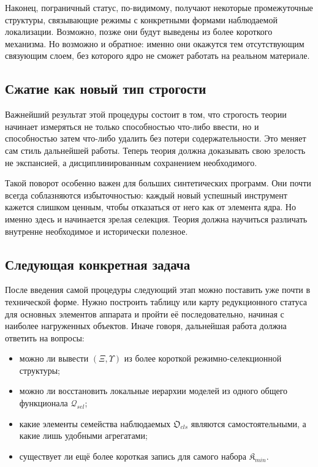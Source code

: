 \documentclass[12pt,a4paper]{article}
\begin{document}
Наконец, пограничный статус, по-видимому, получают некоторые промежуточные структуры, связывающие режимы с конкретными формами наблюдаемой локализации. Возможно, позже они будут выведены из более короткого механизма. Но возможно и обратное: именно они окажутся тем отсутствующим связующим слоем, без которого ядро не сможет работать на реальном материале.

\subsection{Сжатие как новый тип строгости}

Важнейший результат этой процедуры состоит в том, что строгость теории начинает измеряться не только способностью что-либо ввести, но и способностью затем что-либо удалить без потери содержательности. Это меняет сам стиль дальнейшей работы. Теперь теория должна доказывать свою зрелость не экспансией, а дисциплинированным сохранением необходимого.

Такой поворот особенно важен для больших синтетических программ. Они почти всегда соблазняются избыточностью: каждый новый успешный инструмент кажется слишком ценным, чтобы отказаться от него как от элемента ядра. Но именно здесь и начинается зрелая селекция. Теория должна научиться различать внутренне необходимое и исторически полезное.

\subsection{Следующая конкретная задача}

После введения самой процедуры следующий этап можно поставить уже почти в технической форме. Нужно построить таблицу или карту редукционного статуса для основных элементов аппарата и пройти её последовательно, начиная с наиболее нагруженных объектов. Иначе говоря, дальнейшая работа должна ответить на вопросы:
\begin{itemize}
    \item можно ли вывести \((\Xi,\Upsilon)\) из более короткой режимно-селекционной структуры;
    \item можно ли восстановить локальные иерархии моделей из одного общего функционала \(\mathcal{Q}_{sel}\);
    \item какие элементы семейства наблюдаемых \(\mathfrak{O}_{cls}\) являются самостоятельными, а какие лишь удобными агрегатами;
    \item существует ли ещё более короткая запись для самого набора \(\mathfrak{K}_{min}\).
\end{itemize}
\end{document}
